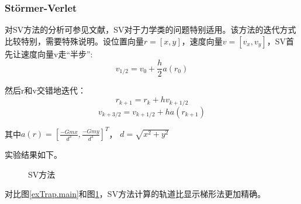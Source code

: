 \documentclass{article}
\begin{document}
\subsubsection{Störmer-Verlet}
\par 对SV方法的分析可参见文献\cite{gardarsson2013some}，SV对于力学类的问题特别适用。该方法的迭代方式比较特别，需要特殊说明。设位置向量$r=[x,y]$，速度向量$v=[v_x,v_y]$，SV首先让速度向量v走“半步”:
$$v_{1/2} = v_0 + \frac{h}{2}a(r_0)$$
\par 然后r和v交错地迭代：
$$r_{k+1} = r_k + hv_{k+1/2}$$
$$v_{k+3/2} = v_{k+1/2} + ha(r_{k+1})$$
\par 其中$a(r)=[\frac{-Gmx}{d^3},\frac{-Gmy}{d^3}]^T$， $d=\sqrt{x^2+y^2}$ 
\par 实验结果如下。
\begin{figure}[H]
	\centering  %
	\caption{SV方法}
	\label{sv.main}
\end{figure}
\par 对比图\ref{exTrap.main}和图\ref{sv.main}，SV方法计算的轨道比显示梯形法更加精确。
\end{document}
